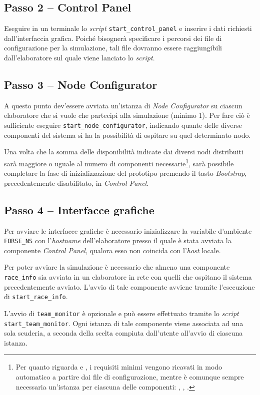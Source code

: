 \subsection*{Passo 2 -- Control Panel}
Eseguire in un terminale lo \textit{script} \texttt{start\_control\_panel} e inserire i dati richiesti dall'interfaccia grafica.
Poiché bisognerà specificare i percorsi dei file di configurazione per la simulazione, tali file dovranno essere raggiungibili dall'elaboratore sul quale viene lanciato lo \textit{script}.

\subsection*{Passo 3 -- Node Configurator}
A questo punto dev'essere avviata un'istanza di \textsl{Node Configurator} su ciascun elaboratore che si vuole che partecipi alla simulazione (minimo 1). Per fare ciò è sufficiente eseguire \texttt{start\_node\_configurator}, indicando quante delle diverse componenti del sistema si ha la possibilità di ospitare su quel determinato nodo.

Una volta che la somma delle disponibilità indicate dai diversi nodi distribuiti sarà maggiore o uguale al numero di componenti necessarie\footnote{Per quanto riguarda \car{} e \team{}, i requisiti minimi vengono ricavati in modo automatico a partire dai file di configurazione, mentre è comunque sempre necessaria un'istanza per ciascuna delle componenti: \evdisp{}, \sched{}, \weather{}.}, sarà possibile completare la fase di inizializzazione del prototipo premendo il tasto \textsl{Bootstrap}, precedentemente disabilitato, in \textsl{Control Panel}.

\subsection*{Passo 4 -- Interfacce grafiche}
Per avviare le interfacce grafiche è necessario inizializzare la variabile d'ambiente \texttt{FORSE\_NS} con l'\textit{hostname} dell'elaboratore presso il quale è stata avviata la componente \textsl{Control Panel}, qualora esso non coincida con l'\textit{host} locale.

Per poter avviare la simulazione è necessario che almeno una componente \texttt{race\_info} sia avviata in un elaboratore in rete con quelli che ospitano il sistema precedentemente avviato. L'avvio di tale componente avviene tramite l'esecuzione di \texttt{start\_race\_info}.

L'avvio di \texttt{team\_monitor} è opzionale e può essere effettuato tramite lo \textit{script} \texttt{start\_team\_monitor}. Ogni istanza di tale componente viene associata ad una sola scuderia, a seconda della scelta compiuta dall'utente all'avvio di ciascuna istanza.

